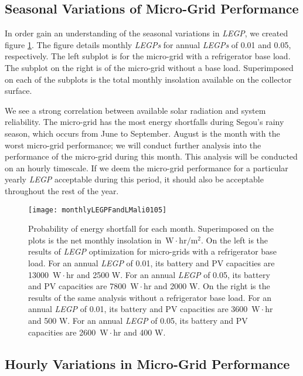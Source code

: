 \documentclass{article}
\newcommand{\unit}[1]{\ensuremath{\, \mathrm{#1}}}
\begin{document}
\subsection{Seasonal Variations of Micro-Grid Performance}

In order gain an understanding of the seasonal variations in \emph{LEGP}, we created figure \ref{monthlyLEGP}. 
The figure details monthly \emph{LEGPs} for annual \emph{LEGPs} of 0.01 and 0.05, respectively. 
The left subplot is for the micro-grid with a refrigerator base load. 
The subplot on the right is of the micro-grid without a base load. 
Superimposed on each of the subplots is the total monthly insolation available on the collector surface.


We see a strong correlation between available solar radiation and system reliability. 
The micro-grid has the most energy shortfalls during Segou's rainy season, which occurs from June to September. 
August is the month with the worst micro-grid performance; we will conduct further analysis into the performance of the micro-grid during this month.
This analysis will be conducted on an hourly timescale. 
If we deem the micro-grid performance for a particular yearly \emph{LEGP} acceptable during this period, it should also be acceptable throughout the rest of the year.


\begin{figure}[ht]
\centering
\texttt{[image: monthlyLEGPFandLMali0105]}
\caption{Probability of energy shortfall for each month. 
Superimposed on the plots is the net monthly insolation in \unit{W\! \cdot \! hr/m^2}. 
On the left is the results of \emph{LEGP} optimization for micro-grids with a refrigerator base load. 
For an annual \emph{LEGP} of 0.01, its battery and PV capacities are 13000 \unit{W \! \cdot \!hr} and 2500 W.
For an annual \emph{LEGP} of 0.05, its battery and PV capacities are 7800 \unit{W \! \cdot \!hr} and 2000 W.
On the right is the results of the same analysis without a refrigerator base load. 
For an annual \emph{LEGP} of 0.01, its battery and PV capacities are 3600 \unit{W \! \cdot \!hr} and 500 W.
For an annual \emph{LEGP} of 0.05, its battery and PV capacities are 2600 \unit{W \! \cdot \!hr} and 400 W.}
\label{monthlyLEGP}
\end{figure} 
\subsection{Hourly Variations in Micro-Grid Performance}
\end{document}
